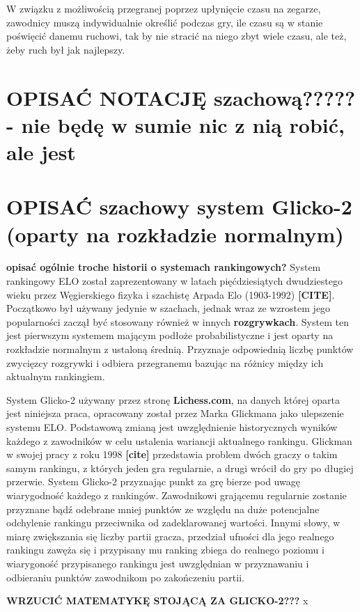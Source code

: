 \documentclass[inzynierska]{pwr_wmat_praca_dyplomowa}
\theoremstyle{plain}
\numberwithin{theorem}{chapter}
\theoremstyle{definition}
\numberwithin{theorem}{chapter}
\begin{document}
W związku z możliwością przegranej poprzez upłynięcie czasu na zegarze, zawodnicy muszą indywidualnie określić podczas gry, ile czasu są w stanie poświęcić danemu ruchowi, tak by nie stracić na niego zbyt wiele czasu, ale też, żeby ruch był jak najlepszy.

\section{OPISAĆ NOTACJĘ szachową????? - nie będę w sumie nic z nią robić, ale jest}

\section{OPISAĆ szachowy system Glicko-2 (oparty na rozkładzie normalnym)}
\textbf{opisać ogólnie troche historii o systemach rankingowych?}
System rankingowy ELO został zaprezentowany w latach pięćdziesiątych dwudziestego wieku przez Węgierskiego fizyka i szachistę Arpada Elo (1903-1992) \textbf{[CITE]}. Początkowo był używany jedynie w szachach, jednak wraz ze wzrostem jego popularności zaczął być stosowany również w innych \textbf{rozgrywkach}. System ten jest pierwszym systemem mającym podłoże probabilistyczne i jest oparty na rozkładzie normalnym z ustaloną średnią. Przyznaje odpowiednią liczbę punktów zwycięzcy rozgrywki i odbiera przegranemu bazując na różnicy między ich aktualnym rankingiem.


System Glicko-2 używany przez stronę \textbf{Lichess.com}, na danych której oparta jest niniejsza praca, opracowany został przez Marka Glickmana jako ulepszenie systemu ELO. Podstawową zmianą jest uwzględnienie historycznych wyników każdego z zawodników w celu ustalenia wariancji aktualnego rankingu. Glickman w swojej pracy z roku 1998 \textbf{[cite]} przedstawia problem dwóch graczy o takim samym rankingu, z których jeden gra regularnie, a drugi wrócił do gry po długiej przerwie. System Glicko-2 przyznając punkt za grę bierze pod uwagę wiarygodność każdego z rankingów. Zawodnikowi grającemu regularnie zostanie przyznane bądź odebrane mniej punktów ze względu na duże potencjalne odchylenie rankingu przeciwnika od zadeklarowanej wartości. Innymi słowy, w miarę zwiększania się liczby partii gracza, przedział ufności dla jego realnego rankingu zawęża się i przypisany mu ranking zbiega do realnego poziomu i wiarygoność przypisanego rankingu jest uwzględnian w przyznawaniu i odbieraniu punktów zawodnikom po zakończeniu partii.

\textbf{WRZUCIĆ MATEMATYKĘ STOJĄCĄ ZA GLICKO-2???}
x
\end{document}
